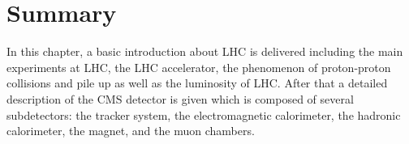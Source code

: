 %

\section{Summary}\label{subsec:LHC_CMS_Summary}

In this chapter, a basic introduction about LHC is delivered including the main experiments at LHC, the LHC accelerator, the phenomenon of proton-proton collisions and pile up as well as the luminosity of LHC. After that a detailed description of the CMS detector is given which is composed of several subdetectors: the tracker system, the electromagnetic calorimeter, the hadronic calorimeter, the magnet, and the muon chambers.
